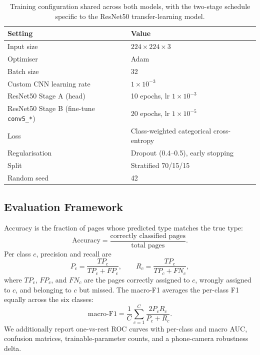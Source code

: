 \documentclass[preprint,12pt]{elsarticle}
\begin{document}
\begin{table}[!ht]
\centering
\caption{Training configuration shared across both models, with the two-stage
schedule specific to the ResNet50 transfer-learning model.}
\label{tab:hparams}
\begin{tabular}{ll}
\toprule
\textbf{Setting} & \textbf{Value} \\
\midrule
Input size & $224\times224\times3$ \\
Optimiser & Adam \\
Batch size & 32 \\
Custom CNN learning rate & $1\times10^{-3}$ \\
ResNet50 Stage A (head) & 10 epochs, lr $1\times10^{-3}$ \\
ResNet50 Stage B (fine-tune \texttt{conv5\_*}) & 20 epochs, lr $1\times10^{-5}$ \\
Loss & Class-weighted categorical cross-entropy \\
Regularisation & Dropout (0.4--0.5), early stopping \\
Split & Stratified 70/15/15 \\
Random seed & 42 \\
\bottomrule
\end{tabular}
\end{table}

\subsection{Evaluation Framework}
Accuracy is the fraction of pages whose predicted type matches the true type:
\begin{equation}
\text{Accuracy} = \frac{\text{correctly classified pages}}{\text{total pages}}.
\label{eq:acc}
\end{equation}
Per class $c$, precision and recall are
\begin{equation}
P_c = \frac{TP_c}{TP_c+FP_c}, \qquad R_c = \frac{TP_c}{TP_c+FN_c},
\label{eq:pr}
\end{equation}
where $TP_c$, $FP_c$, and $FN_c$ are the pages correctly assigned to $c$,
wrongly assigned to $c$, and belonging to $c$ but missed.
The macro-F1 averages the per-class F1 equally across the six classes:
\begin{equation}
\text{macro-F1} = \frac{1}{C}\sum_{c=1}^{C}\frac{2P_cR_c}{P_c+R_c}.
\label{eq:f1}
\end{equation}
We additionally report one-vs-rest ROC curves with per-class and macro AUC,
confusion matrices, trainable-parameter counts, and a phone-camera robustness
delta.
\end{document}
